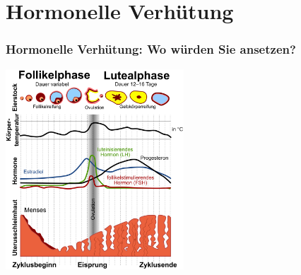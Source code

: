 \documentclass{beamer}
\begin{document}


 











\section{Hormonelle Verhütung}

\begin{frame}
\frametitle{Hormonelle Verhütung: Wo würden Sie ansetzen?}

\begin{center}
\includegraphics[width=0.5\textwidth]{zyklus.png}
\end{center}
\end{frame}
\end{document}
